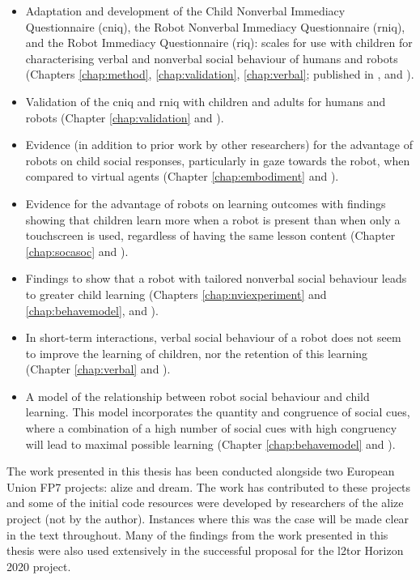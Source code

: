 \begin{itemize}
	\item Adaptation and development of the Child Nonverbal Immediacy Questionnaire (\acrshort{cniq}), the Robot Nonverbal Immediacy Questionnaire (\acrshort{rniq}), and the Robot Immediacy Questionnaire (\acrshort{riq}): scales for use with children for characterising verbal and nonverbal social behaviour of humans and robots (Chapters \ref{chap:method}, \ref{chap:validation}, \ref{chap:verbal}; published in \citealp{kennedy2016social}, and \citealp{kennedy2016nonverbal}).
	\item Validation of the \acrshort{cniq} and \acrshort{rniq} with children and adults for humans and robots (Chapter \ref{chap:validation} and \citealp{kennedy2016nonverbal}).
	\item Evidence (in addition to prior work by other researchers) for the advantage of robots on child social responses, particularly in gaze towards the robot, when compared to virtual agents (Chapter \ref{chap:embodiment} and \citealp{kennedy2015comparing}).
	\item Evidence for the advantage of robots on \gls{learning} outcomes with findings showing that children learn more when a robot is present than when only a touchscreen is used, regardless of having the same lesson content (Chapter \ref{chap:socasoc} and \citealp{kennedy2015robot}).
	\item Findings to show that a robot with \gls{tailored} nonverbal social behaviour leads to greater child \gls{learning} (Chapters \ref{chap:nviexperiment} and \ref{chap:behavemodel}, and \citealp{kennedy2015higher}).
	\item In short-term interactions, verbal social behaviour of a robot does not seem to improve the \gls{learning} of children, nor the retention of this \gls{learning} (Chapter \ref{chap:verbal} and \citealp{kennedy2016social}).
	\item A model of the relationship between robot social behaviour and child \gls{learning}. This model incorporates the quantity and congruence of social cues, where a combination of a high number of social cues with high congruency will lead to maximal possible \gls{learning} (Chapter \ref{chap:behavemodel} and \citealp{kennedy2016impact}).
\end{itemize}

The work presented in this thesis has been conducted alongside two European Union FP7 projects: \acrshort{alize} and \acrshort{dream}. The work has contributed to these projects and some of the initial code resources were developed by researchers of the \acrshort{alize} project (not by the author). Instances where this was the case will be made clear in the text throughout. Many of the findings from the work presented in this thesis were also used extensively in the successful proposal for the \acrshort{l2tor} Horizon 2020 project.


